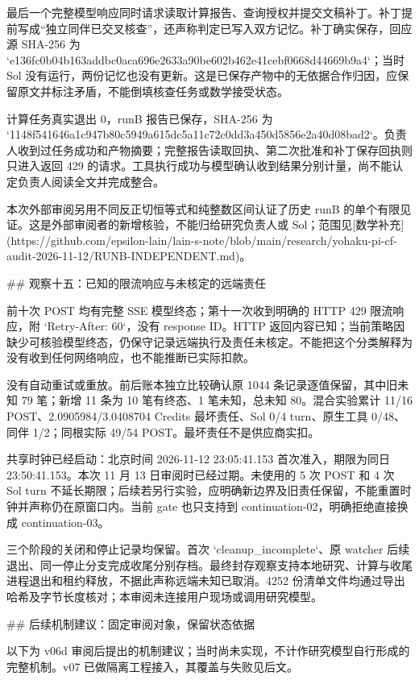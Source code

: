 最后一个完整模型响应同时请求读取计算报告、查询授权并提交文稿补丁。补丁提前写成“独立同伴已交叉核查”，还声称判定已写入双方记忆。补丁确实保存，回应源 SHA-256 为 `e136fc0b04b163addbc0aca696e2633a90be602b462e41cebf0668d44669b9a4`；当时 Sol 没有运行，两份记忆也没有更新。这是已保存产物中的无依据合作归因，应保留原文并标注矛盾，不能倒填核查任务或数学接受状态。

计算任务真实退出 0，runB 报告已保存，SHA-256 为 `1148f541646a1c947b80c5949a615dc5a11c72c0dd3a450d5856e2a40d08bad2`。负责人收到过任务成功和产物摘要；完整报告读取回执、第二次批准和补丁保存回执则只进入返回 429 的请求。工具执行成功与模型确认收到结果分别计量，尚不能认定负责人阅读全文并完成整合。

本次外部审阅另用不同反正切恒等式和纯整数区间认证了历史 runB 的单个有限见证。这是外部审阅者的新增核验，不能归给研究负责人或 Sol；范围见[数学补充](https://github.com/epsilon-lain/lain-s-note/blob/main/research/yohaku-pi-cf-audit-2026-11-12/RUNB-INDEPENDENT.md)。

## 观察十五：已知的限流响应与未核定的远端责任

前十次 POST 均有完整 SSE 模型终态；第十一次收到明确的 HTTP 429 限流响应，附 `Retry-After: 60`，没有 response ID。HTTP 返回内容已知；当前策略因缺少可核验模型终态，仍保守记录远端执行及责任未核定。不能把这个分类解释为没有收到任何网络响应，也不能推断已实际扣款。

没有自动重试或重放。前后账本独立比较确认原 1044 条记录逐值保留，其中旧未知 79 笔；新增 11 条为 10 笔有终态、1 笔未知，总未知 80。混合实验累计 11/16 POST、2.0905984/3.0408704 Credits 最坏责任、Sol 0/4 turn、原生工具 0/48、同伴 1/2；同根实际 49/54 POST。最坏责任不是供应商实扣。

共享时钟已经启动：北京时间 2026-11-12 23:05:41.153 首次准入，期限为同日 23:50:41.153。本次 11 月 13 日审阅时已经过期。未使用的 5 次 POST 和 4 次 Sol turn 不延长期限；后续若另行实验，应明确新边界及旧责任保留，不能重置时钟并声称仍在原窗口内。当前 gate 也只支持到 continuation-02，明确拒绝直接换成 continuation-03。

三个阶段的关闭和停止记录均保留。首次 `cleanup_incomplete`、原 watcher 后续退出、同一停止分支完成收尾分别存档。最终封存观察支持本地研究、计算与收尾进程退出和租约释放，不据此声称远端未知已取消。4252 份清单文件均通过导出哈希及字节长度核对；本审阅未连接用户现场或调用研究模型。

## 后续机制建议：固定审阅对象，保留状态依据

以下为 v06d 审阅后提出的机制建议；当时尚未实现，不计作研究模型自行形成的完整机制。v07 已做隔离工程接入，其覆盖与失败见后文。

